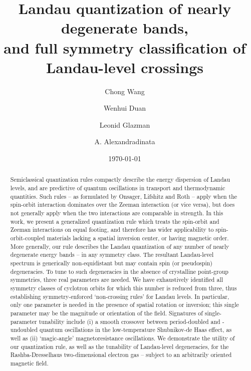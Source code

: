\documentclass[aps, showpacs, twocolumn, notitlepage, superscriptaddress]{revtex4-1}
\begin{document}
\title{Landau quantization of nearly degenerate bands, \\
and full symmetry classification of Landau-level crossings}

\author{Chong Wang}
\author{Wenhui Duan}
\author{Leonid Glazman}
\author{A. Alexandradinata}


\begin{abstract}
Semiclassical quantization rules compactly describe the energy dispersion of Landau levels, and are predictive of quantum oscillations in transport and thermodynamic quantities. Such rules -- as formulated by Onsager, Lifshitz and Roth --
apply when the spin-orbit interaction dominates over the Zeeman interaction (or vice versa), but does not generally apply when the two interactions are comparable in strength. In this work, we present a generalized quantization rule which treats the spin-orbit and Zeeman interactions on equal footing, and therefore has wider applicability to spin-orbit-coupled materials lacking a spatial inversion center, or having magnetic order. More generally, our rule describes the Landau quantization of any number of nearly degenerate energy bands -- in any symmetry class. The resultant Landau-level spectrum is generically non-equidistant but may contain spin (or pseudospin) degeneracies. To tune to such degeneracies in the absence of crystalline point-group symmetries, three real parameters are needed. We have exhaustively identified all symmetry classes of cyclotron orbits for which this number is reduced from three, thus establishing symmetry-enforced `non-crossing rules' for Landau levels.
In particular, only one parameter is needed {in the presence of} spatial rotation {or inversion}; this single parameter may be the magnitude or orientation of the field. Signatures of single-parameter tunability include (i) a smooth crossover between period-doubled and -undoubled quantum oscillations in the low-temperature Shubnikov-de Haas effect, as well as (ii) `magic-angle' magnetoresistance oscillations. We demonstrate the utility of our quantization rule, as well as the tunability of Landau-level degeneracies, for the Rashba-Dresselhaus two-dimensional electron gas -- subject to an arbitrarily oriented magnetic field.
\end{abstract}
\date{\today}
\end{document}
